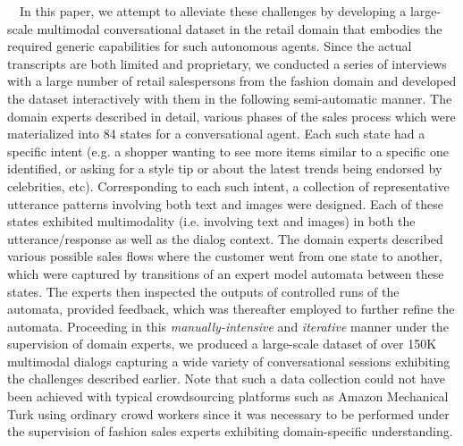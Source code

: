 \documentclass[letterpaper]{article} %
\begin{document}
\-\ \-\ In this paper, we attempt to alleviate these challenges by developing a large-scale multimodal conversational dataset in the retail domain that embodies the required generic capabilities for such autonomous agents. Since the actual transcripts are both limited and proprietary, we conducted a series of interviews with a large number of retail salespersons from the fashion domain and developed the dataset interactively with them in the following semi-automatic manner. The domain experts described in detail, various phases of the sales process which were materialized into 84 states for a conversational agent. Each such state had a specific intent (e.g. a shopper wanting to see more items similar to a specific one identified, or asking for a style tip or about the latest trends being endorsed by celebrities, etc). Corresponding to each such intent, a collection of representative utterance patterns involving both text and images were designed. Each of these states exhibited multimodality (i.e. involving text and images) in both the utterance/response as well as the dialog context. The domain experts described various possible sales flows where the customer went from one state to another, which were captured by transitions of an expert model automata between these states. The experts then inspected the outputs of controlled runs of the automata, provided feedback, which was thereafter employed to further refine the automata. Proceeding in this \emph{manually-intensive} and \emph{iterative} manner under the supervision of domain experts, we produced a large-scale dataset of over 150K multimodal dialogs capturing a wide variety of conversational sessions exhibiting the challenges described earlier. Note that such a data collection could not have been achieved with typical crowdsourcing platforms such as Amazon Mechanical Turk using ordinary crowd workers since it was necessary to be performed under the supervision of fashion sales experts exhibiting domain-specific understanding. 
\\
\-\ \-\ 
\end{document}

